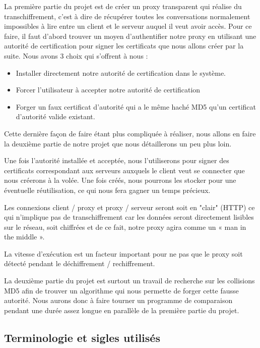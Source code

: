 \documentclass[a4paper,11pt,french]{article}
\begin{document}
La première partie du projet est de créer un proxy transparent qui réalise du transchiffrement, c'est à dire de récupérer toutes les conversations normalement impossibles à lire entre un client et le serveur auquel il veut avoir accès.
Pour ce faire, il faut d'abord trouver un moyen d'authentifier notre proxy en utilisant une autorité de certification pour signer les certificats que nous allons créer par la suite.
Nous avons 3 choix qui s'offrent à nous :

\begin{itemize}
\item Installer directement notre autorité de certification dans le système.
\item Forcer l'utilisateur à accepter notre autorité de certification
\item Forger un faux certificat d'autorité qui a le même haché MD5 qu'un certificat d'autorité valide existant.
\end{itemize}

Cette dernière façon de faire étant plus compliquée à réaliser, nous allons en faire la deuxième partie de notre projet que nous détaillerons un peu plus loin.

Une fois l'autorité installée et acceptée, nous l'utiliserons pour signer des certificats correspondant aux serveurs auxquels le client veut se connecter que nous créerons à la volée. Une fois créés, nous pourrons les stocker pour une éventuelle réutilisation, ce qui nous fera gagner un temps précieux.

	Les connexions client / proxy et proxy / serveur seront soit en "clair" (HTTP) ce qui n'implique pas de transchiffrement car les données seront directement lisibles sur le réseau, soit chiffrées et de ce fait, notre proxy agira comme un « man in the middle ».

	La vitesse d'exécution est un facteur important pour ne pas que le proxy soit détecté pendant le déchiffrement / rechiffrement.

La deuxième partie du projet est surtout un travail de recherche sur les collisions MD5 afin de trouver un algorithme qui nous permette de forger cette fausse autorité. Nous aurons donc à faire tourner un programme de comparaison pendant une durée assez longue en parallèle de la première partie du projet.

\subsection{Terminologie et sigles utilisés}
\end{document}
